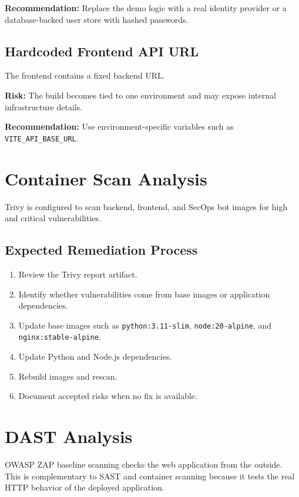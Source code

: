\documentclass[12pt,a4paper]{report}
\begin{document}
\textbf{Recommendation:} Replace the demo logic with a real identity provider or a database-backed user store with hashed passwords.

\subsection{Hardcoded Frontend API URL}

The frontend contains a fixed backend URL.

\textbf{Risk:} The build becomes tied to one environment and may expose internal infrastructure details.

\textbf{Recommendation:} Use environment-specific variables such as \texttt{VITE\_API\_BASE\_URL}.

\section{Container Scan Analysis}

Trivy is configured to scan backend, frontend, and SecOps bot images for high and critical vulnerabilities.

\subsection{Expected Remediation Process}

\begin{enumerate}[leftmargin=*]
    \item Review the Trivy report artifact.
    \item Identify whether vulnerabilities come from base images or application dependencies.
    \item Update base images such as \texttt{python:3.11-slim}, \texttt{node:20-alpine}, and \texttt{nginx:stable-alpine}.
    \item Update Python and Node.js dependencies.
    \item Rebuild images and rescan.
    \item Document accepted risks when no fix is available.
\end{enumerate}

\section{DAST Analysis}

OWASP ZAP baseline scanning checks the web application from the outside. This is complementary to SAST and container scanning because it tests the real HTTP behavior of the deployed application.
\end{document}
